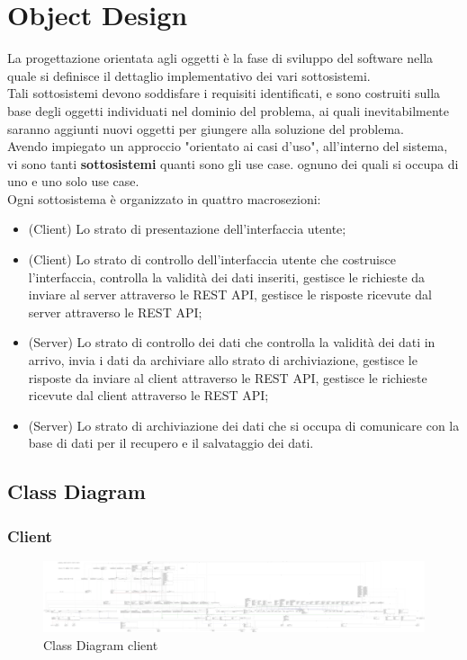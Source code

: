 \chapter{Object Design}
    La progettazione orientata agli oggetti è la fase di sviluppo del software nella quale si definisce il dettaglio implementativo dei vari sottosistemi. \\
    Tali sottosistemi devono soddisfare i requisiti identificati, e sono costruiti sulla base degli oggetti individuati nel dominio del problema, ai quali inevitabilmente saranno aggiunti nuovi oggetti per giungere alla soluzione del problema. \\
    Avendo impiegato un approccio "orientato ai casi d'uso", all'interno del sistema, vi sono tanti \textbf{sottosistemi} quanti sono gli use case. ognuno dei quali si occupa di uno e uno solo use case. \\
    Ogni sottosistema è organizzato in quattro macrosezioni:
    \begin{itemize}
        \item (Client) Lo strato di presentazione dell'interfaccia utente;
        \item (Client) Lo strato di controllo dell'interfaccia utente che costruisce l'interfaccia, controlla la validità dei dati inseriti, gestisce le richieste da inviare al server attraverso le REST API, gestisce le risposte ricevute dal server attraverso le REST API;
        \item (Server) Lo strato di controllo dei dati che controlla la validità dei dati in arrivo, invia i dati da archiviare allo strato di archiviazione, gestisce le risposte da inviare al client attraverso le REST API, gestisce le richieste ricevute dal client attraverso le REST API;
        \item (Server) Lo strato di archiviazione dei dati che si occupa di comunicare con la base di dati per il recupero e il salvataggio dei dati.
    \end{itemize}

    \section{Class Diagram}
        \subsection{Client}
            \begin{figure}[htbp!]
                \includegraphics[width=0.9\linewidth]{Immagini/Diagrammi/Class Diagram/ClassDiagramClient.pdf}
            \caption{Class Diagram client}
            \label{fig:Class Diagram client}
            \end{figure}
